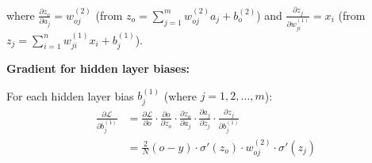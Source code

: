 \documentclass[12pt]{article}
\begin{document}
where $\frac{\partial z_o}{\partial a_j} = w_{oj}^{(2)}$ (from $z_o = \sum_{j=1}^m w_{oj}^{(2)} a_j + b_o^{(2)}$) and $\frac{\partial z_j}{\partial w_{ji}^{(1)}} = x_i$ (from $z_j = \sum_{i=1}^n w_{ji}^{(1)} x_i + b_j^{(1)}$).

\textbf{Gradient for hidden layer biases:}

For each hidden layer bias $b_j^{(1)}$ (where $j = 1, 2, \ldots, m$):
\begin{align*}
\frac{\partial \mathcal{L}}{\partial b_j^{(1)}} &= \frac{\partial \mathcal{L}}{\partial o} \cdot \frac{\partial o}{\partial z_o} \cdot \frac{\partial z_o}{\partial a_j} \cdot \frac{\partial a_j}{\partial z_j} \cdot \frac{\partial z_j}{\partial b_j^{(1)}} \\
&= \frac{2}{N}(o - y) \cdot \sigma'(z_o) \cdot w_{oj}^{(2)} \cdot \sigma'(z_j)
\end{align*}






% 
% 
\end{document}
